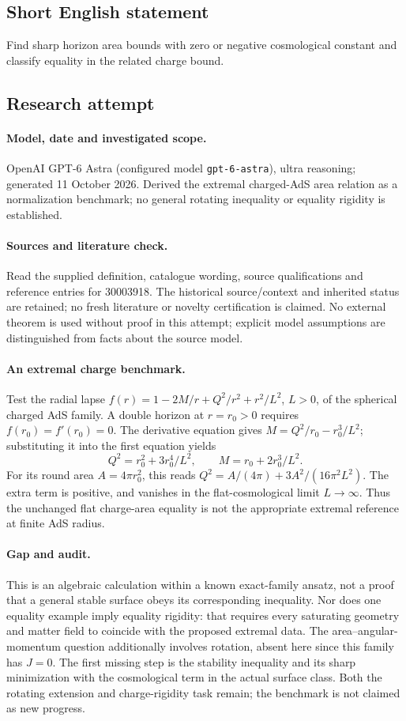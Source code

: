 \documentclass[11pt]{article}
\begin{document}
\subsection{Short English statement}
Find sharp horizon area bounds with zero or negative cosmological constant and classify equality in the related charge bound.
\subsection{Research attempt}
\paragraph{Model, date and investigated scope.}
OpenAI GPT-6 Astra (configured model \texttt{gpt-6-astra}), ultra reasoning; generated 11 October 2026. Derived the extremal charged-AdS area relation as a normalization benchmark; no general rotating inequality or equality rigidity is established.

\paragraph{Sources and literature check.}
Read the supplied definition, catalogue wording, source qualifications and reference entries for 30003918. The historical source/context and inherited status are retained; no fresh literature or novelty certification is claimed. No external theorem is used without proof in this attempt; explicit model assumptions are distinguished from facts about the source model.

\paragraph{An extremal charge benchmark.} Test the radial lapse \(f(r)=1-2M/r+Q^2/r^2+r^2/L^2\), \(L>0\), of the spherical charged AdS family. A double horizon at \(r=r_0>0\) requires \(f(r_0)=f'(r_0)=0\). The derivative equation gives \(M=Q^2/r_0-r_0^3/L^2\); substituting it into the first equation yields
\[
 Q^2=r_0^2+3r_0^4/L^2,\qquad M=r_0+2r_0^3/L^2.
\]
For its round area \(A=4\pi r_0^2\), this reads \(Q^2=A/(4\pi)+3A^2/(16\pi^2L^2)\). The extra term is positive, and vanishes in the flat-cosmological limit \(L\to\infty\). Thus the unchanged flat charge-area equality is not the appropriate extremal reference at finite AdS radius.
\paragraph{Gap and audit.} This is an algebraic calculation within a known exact-family ansatz, not a proof that a general stable surface obeys its corresponding inequality. Nor does one equality example imply equality rigidity: that requires every saturating geometry and matter field to coincide with the proposed extremal data. The area--angular-momentum question additionally involves rotation, absent here since this family has \(J=0\). The first missing step is the stability inequality and its sharp minimization with the cosmological term in the actual surface class. Both the rotating extension and charge-rigidity task remain; the benchmark is not claimed as new progress.
\end{document}
